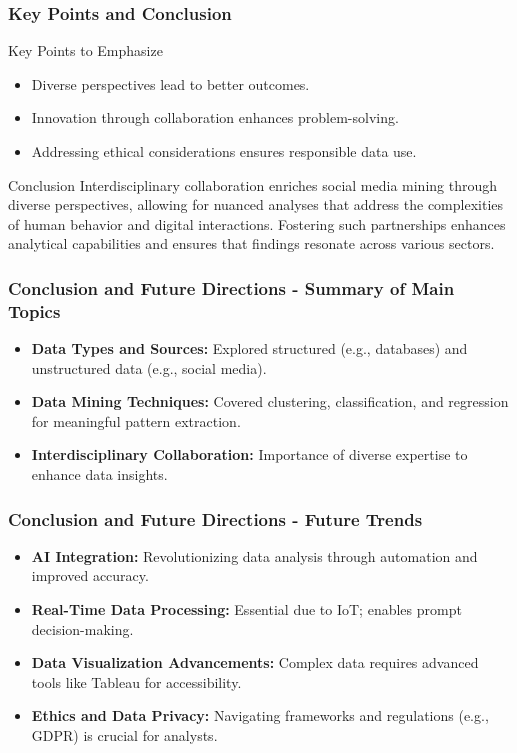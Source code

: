 \documentclass{beamer}
\begin{document}
\begin{frame}[fragile]
    \frametitle{Key Points and Conclusion}
    \begin{block}{Key Points to Emphasize}
        \begin{itemize}
            \item Diverse perspectives lead to better outcomes.
            \item Innovation through collaboration enhances problem-solving.
            \item Addressing ethical considerations ensures responsible data use.
        \end{itemize}
    \end{block}

    \begin{block}{Conclusion}
        Interdisciplinary collaboration enriches social media mining through diverse perspectives, allowing for nuanced analyses that address the complexities of human behavior and digital interactions. Fostering such partnerships enhances analytical capabilities and ensures that findings resonate across various sectors.
    \end{block}
\end{frame}

\begin{frame}[fragile]
    \frametitle{Conclusion and Future Directions - Summary of Main Topics}
    \begin{itemize}
        \item \textbf{Data Types and Sources:} Explored structured (e.g., databases) and unstructured data (e.g., social media).
        \item \textbf{Data Mining Techniques:} Covered clustering, classification, and regression for meaningful pattern extraction.
        \item \textbf{Interdisciplinary Collaboration:} Importance of diverse expertise to enhance data insights.
    \end{itemize}
\end{frame}

\begin{frame}[fragile]
    \frametitle{Conclusion and Future Directions - Future Trends}
    \begin{itemize}
        \item \textbf{AI Integration:} Revolutionizing data analysis through automation and improved accuracy.
        \item \textbf{Real-Time Data Processing:} Essential due to IoT; enables prompt decision-making.
        \item \textbf{Data Visualization Advancements:} Complex data requires advanced tools like Tableau for accessibility.
        \item \textbf{Ethics and Data Privacy:} Navigating frameworks and regulations (e.g., GDPR) is crucial for analysts.
    \end{itemize}
\end{frame}
\end{document}
